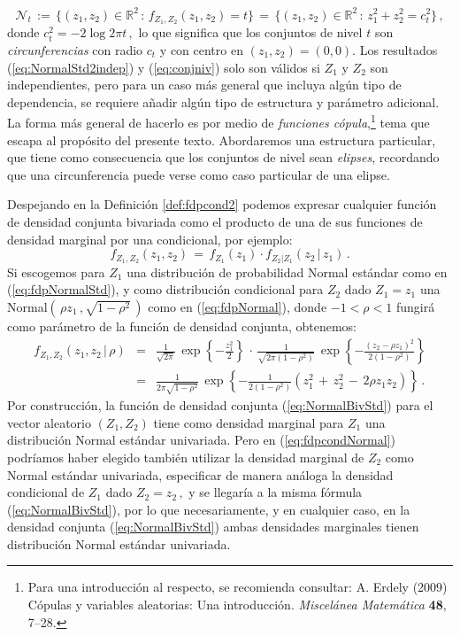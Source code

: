 \documentclass[spanish,10pt,letterpaper]{article}
\newcommand{\Runo}{\mathbb{R}}
\begin{document}
\begin{equation}\label{eq:conjniv}
\mathcal{N}_t \,:=\,\{(z_1,z_2)\in\Runo^2\,:\,f_{Z_1,Z_2}(z_1,z_2)=t\} \,=\, \{(z_1,z_2)\in\Runo^2\,:\,z_1^2+z_2^2=c_t^2\}\,,
\end{equation}
donde $c_t^2=-2\log 2\pi t\,,$ lo que significa que los conjuntos de nivel $t$ son \textit{circunferencias} con radio $c_t$ y con centro en $(z_1,z_2)=(0,0).$ Los resultados (\ref{eq:NormalStd2indep}) y (\ref{eq:conjniv}) solo son válidos si $Z_1$ y $Z_2$ son independientes, pero para un caso más general que incluya algún tipo de dependencia, se requiere añadir algún tipo de estructura y parámetro adicional. La forma más general de hacerlo es por medio de \textit{funciones cópula},\footnote{Para una introducción al respecto, se recomienda consultar: A. Erdely (2009) Cópulas y variables aleatorias: Una introducción. \textit{Miscelánea Matemática} \textbf{48}, 7--28.} tema que escapa al propósito del presente texto. Abordaremos una estructura particular, que tiene como consecuencia que los conjuntos de nivel sean \textit{elipses}, recordando que una circunferencia puede verse como caso particular de una elipse.

\medskip 

Despejando en la Definición \ref{def:fdpcond2} podemos expresar cualquier función de densidad conjunta bivariada como el producto de una de sus funciones de densidad marginal por una condicional, por ejemplo:
\begin{equation}\label{eq:fdpcondNormal}
    f_{Z_1,Z_2}(z_1,z_2) \,=\, f_{Z_1}(z_1)\cdot f_{Z_2|Z_1}(z_2\,|\,z_1)\,.
\end{equation}
Si escogemos para $Z_1$ una distribución de probabilidad Normal estándar como en (\ref{eq:fdpNormalStd}), y como distribución condicional para $Z_2$ dado $Z_1=z_1$ una Normal$(\,\rho z_1\,,\sqrt{1-\rho^2}\,)$ como en (\ref{eq:fdpNormal}), donde $-1<\rho<1$ fungirá como parámetro de la función de densidad conjunta, obtenemos:
\begin{eqnarray}\label{eq:NormalBivStd}
    f_{Z_1,Z_2}(z_1,z_2\,|\,\rho) &=& \frac{1}{\sqrt{2\pi}}\,\exp\left\{-\frac{z_1^2}{2}\right\}\,\cdot\,\frac{1}{\sqrt{2\pi(1-\rho^2)}}\,\exp\left\{-\frac{(z_2-\rho z_1)^2}{2(1-\rho^2)}\right\} \nonumber \\
    &=& \frac{1}{2\pi\sqrt{1-\rho^2}}\,\exp\left\{ -\frac{1}{2(1-\rho^2)}\left(z_1^2\,+\,z_2^2\,-\,2\rho z_1z_2\right) \right\}\,.
\end{eqnarray}
Por construcción, la función de densidad conjunta (\ref{eq:NormalBivStd}) para el vector aleatorio $(Z_1,Z_2)$ tiene como densidad marginal para $Z_1$ una distribución Normal estándar univariada. Pero en (\ref{eq:fdpcondNormal}) podríamos haber elegido también utilizar la densidad marginal de $Z_2$ como Normal estándar univariada, especificar de manera análoga la densidad condicional de $Z_1$ dado $Z_2=z_2\,,$ y se llegaría a la misma fórmula (\ref{eq:NormalBivStd}), por lo que necesariamente, y en cualquier caso, en la densidad conjunta (\ref{eq:NormalBivStd}) ambas densidades marginales tienen distribución Normal estándar univariada. 
\end{document}
